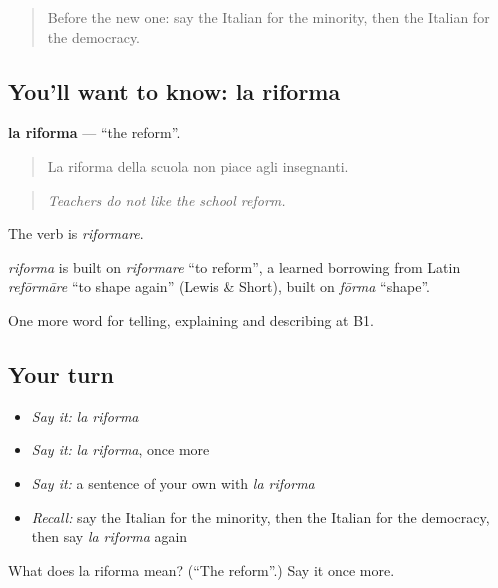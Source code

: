\begin{quote}
Before the new one: say the Italian for the minority, then the Italian for the democracy.
\end{quote}

\subsection*{You'll want to know: la riforma}
\textbf{la riforma} — \textquotedblleft{}the reform\textquotedblright{}.

\begin{quote}
La riforma della scuola non piace agli insegnanti.
\end{quote}

\begin{quote}
\emph{Teachers do not like the school reform.}
\end{quote}

The verb is \emph{riformare}.

\begin{cousinweb}
\emph{riforma} is built on \emph{riformare} \textquotedblleft{}to reform\textquotedblright{}, a learned borrowing from Latin \emph{refōrmāre} \textquotedblleft{}to shape again\textquotedblright{} (Lewis \& Short), built on \emph{fōrma} \textquotedblleft{}shape\textquotedblright{}.
\end{cousinweb}

\begin{grammarlens}[title={What you've built}]
One more word for telling, explaining and describing at B1.
\end{grammarlens}

\subsection*{Your turn}
\begin{itemize}
\raggedright
  \item \emph{Say it:} \emph{la riforma}
  \item \emph{Say it:} \emph{la riforma}, once more
  \item \emph{Say it:} a sentence of your own with \emph{la riforma}
  \item \emph{Recall:} say the Italian for the minority, then the Italian for the democracy, then say \emph{la riforma} again
\end{itemize}

\begin{tcolorbox}[breakable,colback=teal!4,colframe=teal!35!black,title={Before you move on}]
What does la riforma mean? (\textquotedblleft{}The reform\textquotedblright{}.) Say it once more.
\end{tcolorbox}

